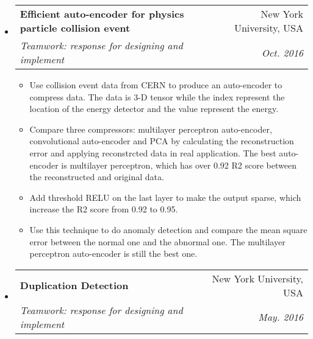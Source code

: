 \documentclass[a4paper,10pt]{article}
\makeatletter
\newcommand{\resitem}[1]{\item #1 \vspace{-2pt}}
\renewcommand{\normalsize}{\fontsize{12pt}{\baselineskip}\selectfont}
\newcommand{\ressubheading}[4]{
	\begin{tabular*}{6.5in}{l@{\extracolsep{\fill}}r}
		\textbf{#1} & #2 \\
		\textit{#3} & \textit{#4} \\
	\end{tabular*}\vspace{-6pt}}
\makeatother
\begin{document}
\begin{itemize}
				\item \ressubheading{{\normalsize Efficient auto-encoder for physics particle collision event}}{New York University, USA}{\normalsize Teamwork: response for designing and implement}{Oct. 2016}
				
				\begin{itemize}
					\resitem{Use collision event data from CERN to produce an auto-encoder to compress data. The data is 3-D tensor while the index represent the location of the energy detector and the value represent the energy.}
					\resitem{Compare three compressors: multilayer perceptron auto-encoder, convolutional auto-encoder and PCA by calculating the reconstruction error and applying reconstrcted data in real application. The best auto-encoder is multilayer perceptron, which has over 0.92 R2 score between the reconstructed and original data.}
					\resitem{Add threshold RELU on the last layer to make the output sparse, which increase the R2 score from 0.92 to 0.95.}
					\resitem{Use this technique to do anomaly detection and compare the mean square error between the normal one and the abnormal one. The multilayer perceptron auto-encoder is still the best one.}
				\end{itemize}
			\item \ressubheading{\normalsize Duplication Detection}{New York University, USA}{\normalsize Teamwork: response for designing and implement}{May. 2016}
			

\end{itemize}
\end{document}
